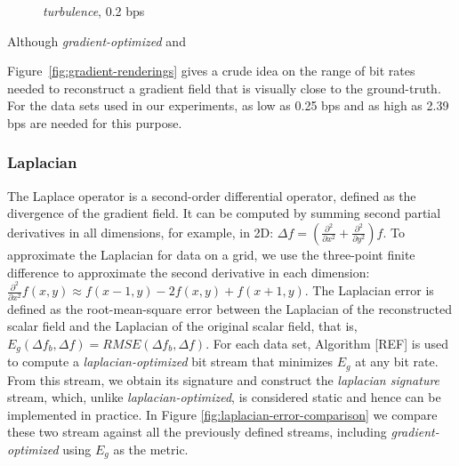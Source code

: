 \begin{figure}[h]
	\centering
	\caption{\emph{turbulence}, 0.2 bps}
  \label{fig:gradient-rendering-diff}
\end{figure}

Although \emph{gradient-optimized} and \emph{}

Figure~\ref{fig:gradient-renderings} gives a crude idea on the range of bit rates needed to
reconstruct a gradient field that is visually close to the ground-truth. For the data sets used in
our experiments, as low as 0.25 bps and as high as 2.39 bps are needed for this purpose.

\subsubsection{Laplacian}
\label{sec:laplacian}

The Laplace operator is a second-order differential operator, defined as the divergence of the
gradient field. It can be computed by summing second partial derivatives in all dimensions, for
example, in 2D: $\Delta f=(\frac{{\partial}^2}{\partial{x^2}}+\frac{{\partial}^2}{\partial{y^2}})f$.
To approximate the Laplacian for data on a grid, we use the three-point finite difference to
approximate the second derivative in each dimension: $\frac{{\partial}^2}{\partial{x^2}}f(x,y)
\approx f(x-1,y)-2f(x,y)+f(x+1,y)$. The Laplacian error is defined as the root-mean-square error
between the Laplacian of the reconstructed scalar field and the Laplacian of the original scalar
field, that is, $E_g(\Delta f_b,\Delta f)=RMSE(\Delta f_b,\Delta f)$. For each data set, Algorithm
[REF] is used to compute a \emph{laplacian-optimized} bit stream that minimizes $E_g$ at any bit
rate. From this stream, we obtain its signature and construct the \emph{laplacian signature} stream,
which, unlike \emph{laplacian-optimized}, is considered static and hence can be implemented in
practice. In Figure \ref{fig:laplacian-error-comparison} we compare these two stream against all the
previously defined streams, including \emph{gradient-optimized} using $E_g$ as the metric.

